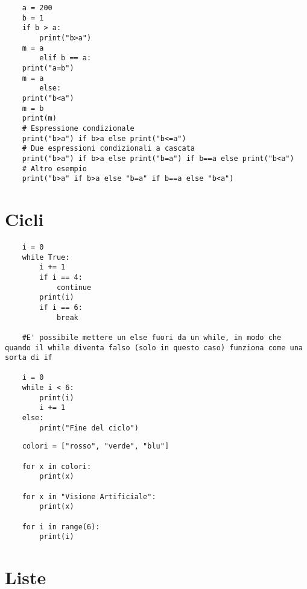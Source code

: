 \begin{lstlisting}
	a = 200
	b = 1
	if b > a:
		print("b>a")
	m = a
		elif b == a:
	print("a=b")
	m = a
		else:
	print("b<a")
	m = b
	print(m)
	# Espressione condizionale
	print("b>a") if b>a else print("b<=a")
	# Due espressioni condizionali a cascata
	print("b>a") if b>a else print("b=a") if b==a else print("b<a")
	# Altro esempio
	print("b>a" if b>a else "b=a" if b==a else "b<a")
\end{lstlisting}

\section{Cicli}


\begin{lstlisting}
	i = 0
	while True:
		i += 1
		if i == 4:
			continue
		print(i)
		if i == 6:
			break
	
	#E' possibile mettere un else fuori da un while, in modo che quando il while diventa falso (solo in questo caso) funziona come una sorta di if
	
	i = 0
	while i < 6:
		print(i)
		i += 1
	else:
		print("Fine del ciclo")
\end{lstlisting}

\begin{lstlisting}
	colori = ["rosso", "verde", "blu"]
	
	for x in colori:
		print(x)
	
	for x in "Visione Artificiale":
		print(x)
	
	for i in range(6):
		print(i)
\end{lstlisting}

\section{Liste}


